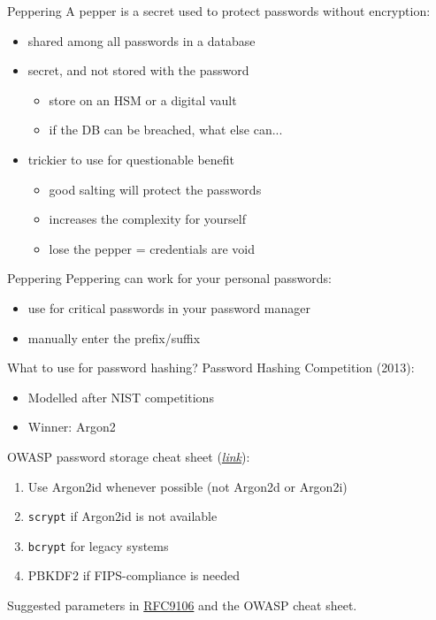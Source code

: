 \begin{frame}{Peppering}
  A pepper is a secret used to protect passwords without encryption:
  \begin{itemize}[<+(1)->]
    \item shared among all passwords in a database
    \item secret, and not stored with the password
    \begin{itemize}
      \item store on an HSM or a digital vault
      \item if the DB can be breached, what else can...
    \end{itemize}
    \item trickier to use for questionable benefit
    \begin{itemize}
      \item good salting will protect the passwords
      \item increases the complexity for yourself
      \item lose the pepper = credentials are void
    \end{itemize}
  \end{itemize}
\end{frame}

\begin{frame}{Peppering}
  Peppering can work for your personal passwords:
  \begin{itemize}[<+(1)->]
    \item use for critical passwords in your password manager
    \item manually enter the prefix/suffix
  \end{itemize}
\end{frame}

\begin{frame}{What to use for password hashing?}
  Password Hashing Competition (2013):
  \begin{itemize}[<+(1)->]
    \item Modelled after NIST competitions
    \item Winner: Argon2
  \end{itemize}

  \vspace*{1em}

  \pause
  OWASP password storage cheat sheet (\href{https://cheatsheetseries.owasp.org/cheatsheets/Password_Storage_Cheat_Sheet.html}{\textit{link}}):
  \begin{enumerate}[<+(1)->]
    \item Use Argon2id whenever possible (not Argon2d or Argon2i)
    \item \texttt{scrypt} if Argon2id is not available
    \item \texttt{bcrypt} for legacy systems
    \item PBKDF2 if FIPS-compliance is needed
  \end{enumerate}

  \pause
  Suggested parameters in \href{https://datatracker.ietf.org/doc/html/rfc9106\#name-parameter-choice}{RFC9106} and the OWASP cheat sheet.
\end{frame}


